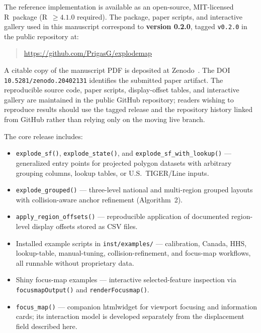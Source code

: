 \documentclass[12pt, a4paper]{article}
\numberwithin{equation}{section}
\begin{document}
The reference implementation is available as an open-source, MIT-licensed
\textsf{R}~package (\textsf{R}~$\geq 4.1.0$ required).
The package, paper scripts, and interactive gallery used in this manuscript
correspond to \textbf{version 0.2.0}, tagged \texttt{v0.2.0} in the public
repository at:

\begin{quote}
\url{https://github.com/PrigasG/explodemap}
\end{quote}

\noindent A citable copy of the manuscript PDF is deposited at
Zenodo~\citep{zenodo_explodemap}. The DOI \texttt{10.5281/zenodo.20402131}
identifies the submitted paper artifact. The reproducible source code, paper
scripts, display-offset tables, and interactive gallery are maintained in the
public GitHub repository; readers wishing to reproduce results should use the
tagged release and the repository history linked from GitHub rather than relying
only on the moving live branch.

The core release includes:
\begin{itemize}
  \item \texttt{explode\_sf()}, \texttt{explode\_state()}, and
        \texttt{explode\_sf\_with\_lookup()} --- generalized entry points for
        projected polygon datasets with arbitrary grouping columns, lookup
        tables, or U.S.\ TIGER/Line inputs.
  \item \texttt{explode\_grouped()} --- three-level national and multi-region
        grouped layouts with collision-aware anchor refinement (Algorithm~2).
  \item \texttt{apply\_region\_offsets()} --- reproducible application of
        documented region-level display offsets stored as CSV files.
  \item Installed example scripts in \texttt{inst/examples/} ---
        calibration, Canada, HHS, lookup-table, manual-tuning,
        collision-refinement, and focus-map workflows, all runnable without
        proprietary data.
  \item Shiny focus-map examples --- interactive selected-feature
        inspection via \texttt{focusmapOutput()} and \texttt{renderFocusmap()}.
  \item \texttt{focus\_map()} --- companion htmlwidget for viewport focusing
        and information cards; its interaction model is developed separately
        from the displacement field described here.
\end{itemize}
\end{document}
